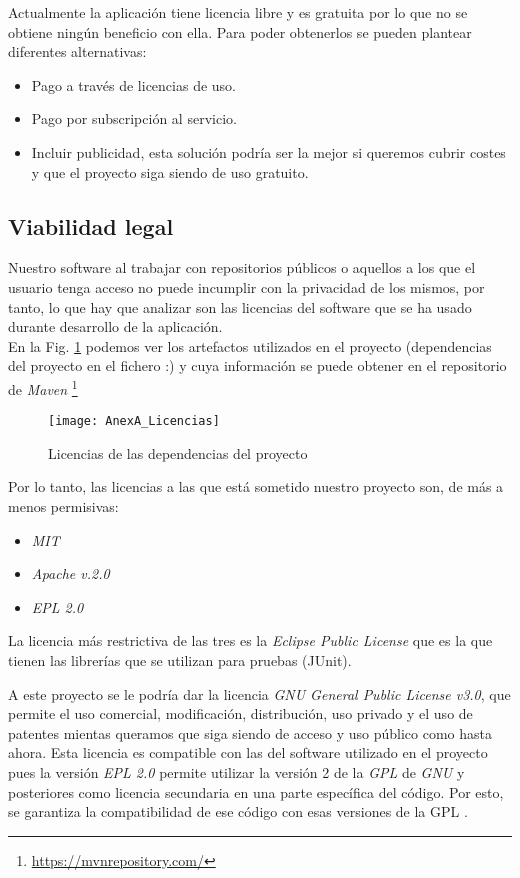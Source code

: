 Actualmente la aplicación tiene licencia libre y es gratuita por lo que no se obtiene ningún beneficio con ella. Para poder obtenerlos se pueden plantear diferentes alternativas:

\begin{itemize}
	\item Pago a través de licencias de uso.
	\item Pago por subscripción al servicio.
	\item Incluir publicidad, esta solución podría ser la mejor si queremos cubrir costes y que el proyecto siga siendo de uso gratuito.
\end{itemize}


\subsection{Viabilidad legal}
Nuestro software al trabajar con repositorios públicos o aquellos a los que el usuario tenga acceso no puede incumplir con la privacidad de los mismos, por tanto, lo que hay que analizar son las licencias del software que se ha usado durante desarrollo de la aplicación.\\
 En la Fig. \ref{fig:AnexA_Licencias} podemos ver los artefactos utilizados en el proyecto (dependencias del proyecto en el fichero :) y cuya información se puede obtener en el repositorio de \textit{Maven} \footnote{\url{https://mvnrepository.com/}} 

\begin{figure}[!h]
	\centering
	\texttt{[image: AnexA\_Licencias]}
	\caption{Licencias de las dependencias del proyecto}
	\label{fig:AnexA_Licencias}
\end{figure}
\FloatBarrier

Por lo tanto, las licencias a las que está sometido nuestro proyecto son, de más a menos permisivas:
\begin{itemize}
	\item \textit{MIT}
	\item \textit{Apache v.2.0}
	\item \textit{EPL 2.0}
\end{itemize}

La licencia más restrictiva de las tres es la \textit{Eclipse Public License} que es la que tienen las librerías que se utilizan para pruebas (JUnit).

A este proyecto se le podría dar la licencia \textit{GNU General Public License v3.0}, que permite el uso comercial, modificación, distribución, uso privado y el uso de patentes mientas queramos que siga siendo de acceso y uso público como hasta ahora.
Esta licencia es compatible con las del software utilizado en el proyecto pues la versión \textit{EPL 2.0} permite utilizar la versión 2 de la \textit{GPL} de \textit{GNU} y posteriores como licencia secundaria en una parte específica del código. Por esto, se garantiza la compatibilidad de ese código con esas versiones de la GPL \cite{santiago_lista_2019}.
